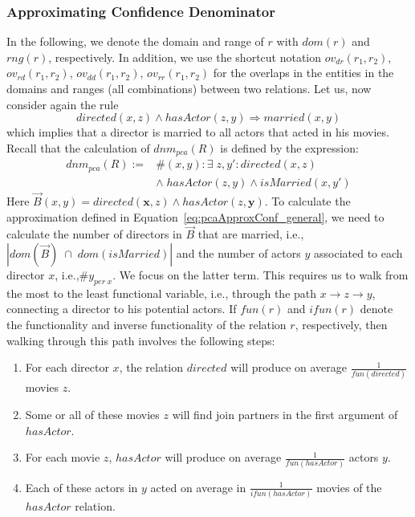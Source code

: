 \subsubsection{Approximating Confidence Denominator} \label{sec:appr}
In the following, we denote the domain and range of $r$ with $dom(r)$ and $rng(r)$, respectively.
In addition, we use the shortcut notation $ov_{dr}(r_1,r_2)$, $ov_{rd}(r_1,r_2)$, $ov_{dd}(r_1,r_2)$, $ov_{rr}(r_1,r_2)$
for the overlaps in the entities in the domains and ranges (all combinations) between two relations.
Let us, now consider again the rule
\[
 directed(x,z) \wedge hasActor(z,y) \Rightarrow married(x,y)
\]
which implies that a director is married to all actors that acted in his movies.
Recall that the calculation of $dnm_{pca}(R)$ is defined by the expression:
\[
\begin{array}{rl}
dnm_{pca}(R) := &\#(x,y): \exists\; z, y': directed(x,z)  \\
  &\wedge\; hasActor(z,y) \wedge isMarried(x,y') \label{eq:denomPCAExample}
\end{array}
\]
Here $\vec{B}(x, y) = directed(\bm{x},z) \wedge hasActor(z,\bm{y})$.
To calculate the approximation defined in Equation~\ref{eq:pcaApproxConf_general}, 
we need to calculate the number of directors in $\vec{B}$ that are married, i.e.,  
$|dom(\vec{B})\;\cap\;dom(isMarried)|$ and the number of actors $y$ 
associated to each director $x$, i.e.,$\#y_{per\;x}$.
We focus on the latter term. 
This requires us to walk from the most to the least functional variable, i.e., through the path $x \rightarrow z \rightarrow y$, connecting a director to his potential actors. 
If $fun(r)$ and $ifun(r)$
denote the functionality and inverse functionality of the relation $r$, respectively, then
walking through this path involves the following steps:
\begin{enumerate} \itemsep +0.3ex
 \item For each director $x$, the relation $directed$ will produce on average $\frac{1}{fun(directed)}$ movies $z$.
 \item Some or all of these movies $z$ will find join partners in the first argument of $hasActor$.
 \item For each movie $z$, $hasActor$ will produce on average $\frac{1}{fun(hasActor)}$ actors $y$.
 \item Each of these actors in $y$ acted on average in  $\frac{1}{ifun(hasActor)}$ movies of the $hasActor$ relation.
\end{enumerate}

